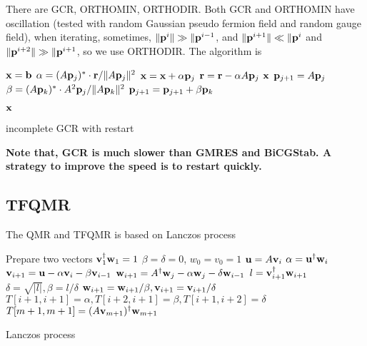 There are GCR, ORTHOMIN, ORTHODIR. Both GCR and ORTHOMIN have oscillation (tested with random Gaussian pseudo fermion field and random gauge field), when iterating, sometimes, $\|{\bf p}^{i}\|\gg \|{\bf p}^{i-1}$, and $\|{\bf p}^{i+1}\|\ll \|{\bf p}^{i}$ and $\|{\bf p}^{i+2}\|\gg \|{\bf p}^{i+1}$, so we use ORTHODIR. The algorithm is
\begin{algorithm}[H]
\begin{algorithmic}
\State ${\bf x}={\bf b}$
        \State $\alpha = (A{\bf p}_j)^*\cdot {\bf r} / \|A{\bf p}_j\|^2$
        \State ${\bf x}={\bf x}+\alpha {\bf p}_j$
        \State ${\bf r}={\bf r}-\alpha A{\bf p}_j$
            \Return $\bf x$
        \EndIf
        \State ${\bf p}_{j+1}=A{\bf p}_j$
            \State $\beta = (A{\bf p}_k)^*\cdot A^2{\bf p}_j / \|A{\bf p}_k\|^2$
            \State ${\bf p}_{j+1}={\bf p}_{j+1}+\beta {\bf p}_k$
        \EndFor
    \EndFor
\EndFor

\Return $\bf x$
\end{algorithmic}
\caption{incomplete GCR with restart}
\end{algorithm}

\textbf{Note that, GCR is much slower than GMRES and BiCGStab. A strategy to improve the speed is to restart quickly.} 

\subsection{\label{sec:TFQMR}TFQMR}

The QMR and TFQMR is based on Lanczos process~\cite{sparselinearbook1}
\begin{algorithm}[H]
\begin{algorithmic}
\State Prepare two vectors ${\bf v}_1^{\dagger}{\bf w}_1=1$
\State $\beta=\delta =0$, $w_0 = v_0=1$
    \State ${\bf u}=A {\bf v}_i$
    \State $\alpha = {\bf u}^{\dagger} {\bf w}_i$
    \State ${\bf v}_{i+1}={\bf u}-\alpha {\bf v}_{i}-\beta {\bf v}_{i-1}$
    \State ${\bf w}_{i+1}=A^{\dagger}{\bf w}_j-\alpha {\bf w}_{j}-\delta {\bf w}_{i-1}$
    \State $l={\bf v}_{i+1}^{\dagger} {\bf w}_{i+1}$
    \State $\delta = \sqrt{|l|}, \beta = l / \delta$
    \State ${\bf w}_{i+1} = {\bf w}_{i+1}/\beta, {\bf v}_{i+1} = {\bf v}_{i+1} / \delta$
    \State $T[i+1,i+1]=\alpha,T[i+2,i+1]=\beta,T[i+1,i+2]=\delta$
\EndFor
\State $T[m+1,m+1]=(A{\bf v}_{m+1})^{\dagger} {\bf w}_{m+1}$
\end{algorithmic}
\caption{\label{alg.Lanczos}Lanczos process}
\end{algorithm}

